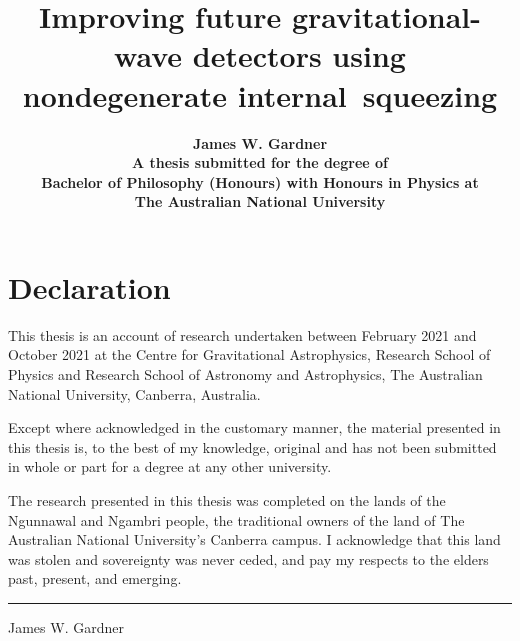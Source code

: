 \documentclass[onecolumn,12pt,a4paper,openany,oneside]{book}
\begin{document}
\begin{titlepage}
\hypersetup{pageanchor=false}
\title{\textbf{Improving future gravitational-wave detectors using nondegenerate internal~squeezing}\\[2cm]}
\author{\textbf{James W. Gardner}\\[6cm]
\textbf{A thesis submitted for the degree of}\\
\textbf{Bachelor of Philosophy (Honours) with Honours in Physics at} \\
\textbf{The Australian National University}\\[1cm]}
\date{\textbf{\thismonth}}
\maketitle
\end{titlepage}

\hypersetup{pageanchor=true}
\newpage

\sloppy

\chapter*{Declaration}

This thesis is an account of research undertaken between February 2021 and October 2021 at the Centre for Gravitational Astrophysics, Research School of Physics and Research School of Astronomy and Astrophysics, The Australian National University, Canberra, Australia.

Except where acknowledged in the customary manner, the material presented in this thesis is, to the best of my knowledge, original and has not been submitted in whole or part for a degree at any other university.

The research presented in this thesis was completed on the lands of the Ngunnawal and Ngambri people, the traditional owners of the land of The Australian National University's Canberra campus. I acknowledge that this land was stolen and sovereignty was never ceded, and pay my respects to the elders past, present, and emerging. %

\vspace{20mm}
\hspace{80mm}\rule{40mm}{.15mm}\par
\hspace{80mm} James W. Gardner\par
\hspace{80mm} \thismonth
\end{document}
